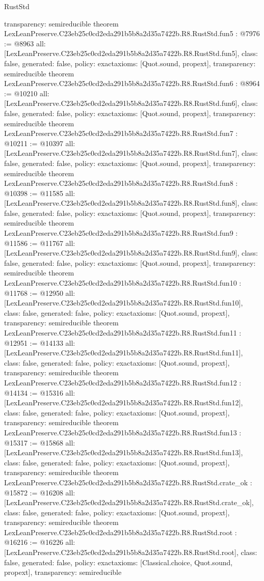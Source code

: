 \begin{lexlean}{RustStd}
\begin{coremodule}
{  transparency: semireducible
}
theorem LexLeanPreserve.C23eb25c0cd2eda291b5b8a2d35a7422b.R8.RustStd.fun5 : @7976 := @8963 {
  all: [LexLeanPreserve.C23eb25c0cd2eda291b5b8a2d35a7422b.R8.RustStd.fun5],
  class: false,
  generated: false,
  policy: exact{axioms: [Quot.sound, propext]},
  transparency: semireducible
}
theorem LexLeanPreserve.C23eb25c0cd2eda291b5b8a2d35a7422b.R8.RustStd.fun6 : @8964 := @10210 {
  all: [LexLeanPreserve.C23eb25c0cd2eda291b5b8a2d35a7422b.R8.RustStd.fun6],
  class: false,
  generated: false,
  policy: exact{axioms: [Quot.sound, propext]},
  transparency: semireducible
}
theorem LexLeanPreserve.C23eb25c0cd2eda291b5b8a2d35a7422b.R8.RustStd.fun7 : @10211 := @10397 {
  all: [LexLeanPreserve.C23eb25c0cd2eda291b5b8a2d35a7422b.R8.RustStd.fun7],
  class: false,
  generated: false,
  policy: exact{axioms: [Quot.sound, propext]},
  transparency: semireducible
}
theorem LexLeanPreserve.C23eb25c0cd2eda291b5b8a2d35a7422b.R8.RustStd.fun8 : @10398 := @11585 {
  all: [LexLeanPreserve.C23eb25c0cd2eda291b5b8a2d35a7422b.R8.RustStd.fun8],
  class: false,
  generated: false,
  policy: exact{axioms: [Quot.sound, propext]},
  transparency: semireducible
}
theorem LexLeanPreserve.C23eb25c0cd2eda291b5b8a2d35a7422b.R8.RustStd.fun9 : @11586 := @11767 {
  all: [LexLeanPreserve.C23eb25c0cd2eda291b5b8a2d35a7422b.R8.RustStd.fun9],
  class: false,
  generated: false,
  policy: exact{axioms: [Quot.sound, propext]},
  transparency: semireducible
}
theorem LexLeanPreserve.C23eb25c0cd2eda291b5b8a2d35a7422b.R8.RustStd.fun10 : @11768 := @12950 {
  all: [LexLeanPreserve.C23eb25c0cd2eda291b5b8a2d35a7422b.R8.RustStd.fun10],
  class: false,
  generated: false,
  policy: exact{axioms: [Quot.sound, propext]},
  transparency: semireducible
}
theorem LexLeanPreserve.C23eb25c0cd2eda291b5b8a2d35a7422b.R8.RustStd.fun11 : @12951 := @14133 {
  all: [LexLeanPreserve.C23eb25c0cd2eda291b5b8a2d35a7422b.R8.RustStd.fun11],
  class: false,
  generated: false,
  policy: exact{axioms: [Quot.sound, propext]},
  transparency: semireducible
}
theorem LexLeanPreserve.C23eb25c0cd2eda291b5b8a2d35a7422b.R8.RustStd.fun12 : @14134 := @15316 {
  all: [LexLeanPreserve.C23eb25c0cd2eda291b5b8a2d35a7422b.R8.RustStd.fun12],
  class: false,
  generated: false,
  policy: exact{axioms: [Quot.sound, propext]},
  transparency: semireducible
}
theorem LexLeanPreserve.C23eb25c0cd2eda291b5b8a2d35a7422b.R8.RustStd.fun13 : @15317 := @15868 {
  all: [LexLeanPreserve.C23eb25c0cd2eda291b5b8a2d35a7422b.R8.RustStd.fun13],
  class: false,
  generated: false,
  policy: exact{axioms: [Quot.sound, propext]},
  transparency: semireducible
}
theorem LexLeanPreserve.C23eb25c0cd2eda291b5b8a2d35a7422b.R8.RustStd.crate_ok : @15872 := @16208 {
  all: [LexLeanPreserve.C23eb25c0cd2eda291b5b8a2d35a7422b.R8.RustStd.crate_ok],
  class: false,
  generated: false,
  policy: exact{axioms: [Quot.sound, propext]},
  transparency: semireducible
}
theorem LexLeanPreserve.C23eb25c0cd2eda291b5b8a2d35a7422b.R8.RustStd.root : @16216 := @16226 {
  all: [LexLeanPreserve.C23eb25c0cd2eda291b5b8a2d35a7422b.R8.RustStd.root],
  class: false,
  generated: false,
  policy: exact{axioms: [Classical.choice, Quot.sound, propext]},
  transparency: semireducible
}


\end{coremodule}
\end{lexlean}

